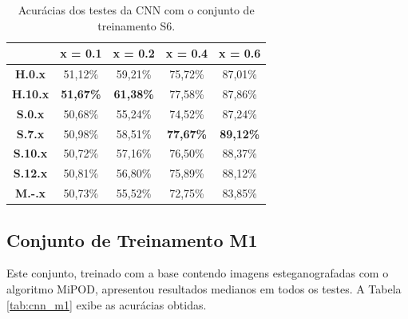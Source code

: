 \begin{table}[!htb]
\centering
\begin{tabular}{c|c|c|c|c|}
\cline{2-5}
\textbf{}                             & \textbf{x = 0.1} & \textbf{x = 0.2} & \textbf{x = 0.4} & \textbf{x = 0.6} \\ \hline
\multicolumn{1}{|c|}{\textbf{H.0.x}}  & 51,12\%          & 59,21\%          & 75,72\%          & 87,01\%          \\ \hline
\multicolumn{1}{|c|}{\textbf{H.10.x}} & \textbf{51,67\%} & \textbf{61,38\%} & 77,58\%          & 87,86\%          \\ \hline
\multicolumn{1}{|c|}{\textbf{S.0.x}}  & 50,68\%          & 55,24\%          & 74,52\%          & 87,24\%          \\ \hline
\multicolumn{1}{|c|}{\textbf{S.7.x}}  & 50,98\%          & 58,51\%          & \textbf{77,67\%} & \textbf{89,12\%} \\ \hline
\multicolumn{1}{|c|}{\textbf{S.10.x}} & 50,72\%          & 57,16\%          & 76,50\%          & 88,37\%          \\ \hline
\multicolumn{1}{|c|}{\textbf{S.12.x}} & 50,81\%          & 56,80\%          & 75,89\%          & 88,12\%          \\ \hline
\multicolumn{1}{|c|}{\textbf{M.-.x}}  & 50,73\%          & 55,52\%          & 72,75\%          & 83,85\%          \\ \hline
\end{tabular}
\caption{Acurácias dos testes da CNN com o conjunto de treinamento S6.}
\label{tab:cnn_s6}
\end{table}


\subsection{Conjunto de Treinamento M1}

Este conjunto, treinado com a base contendo imagens esteganografadas com o algoritmo MiPOD, apresentou resultados medianos em todos os testes. A Tabela \ref{tab:cnn_m1} exibe as acurácias obtidas.

